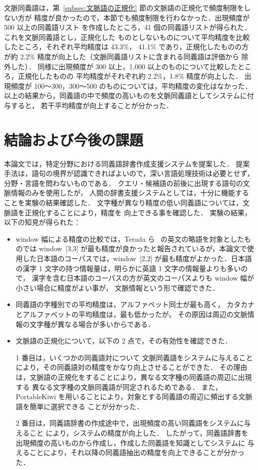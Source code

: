 \documentclass[japanese]{jnlp_1.4}
\begin{document}
文脈同義語は，第~\ref{subsec:文脈語の正規化} 節の文脈語の正規化で頻度制限をしない方が
精度が良かったので，本節でも頻度制限を行わなかった．出現頻度が 500 以上の同義語リスト
を作成したところ，41 個の同義語リストが得られた．これを文脈同義語とし，正規化した
ものとしないものについて平均精度を比較したところ，それぞれ平均精度は 43.3\%，
41.1\% であり，正規化したものの方が約 2.2\% 精度が向上した（文脈同義語リストに含まれる同義語は評価から
除外した）．
同様に出現頻度が 300 以上，1,000 以上のものについて比較したところ，正規化したものの
平均精度がそれぞれ約 2.2\%，1.8\% 精度が向上した．
出現頻度が 100〜300，300〜500 のものについては，平均精度の変化はなかった．
以上の結果から，同義語の中で頻度の高いものを文脈同義語としてシステムに付与すると，
若干平均精度が向上することが分かった．




\section{結論および今後の課題}

本論文では，特定分野における同義語辞書作成支援システムを提案した．
提案手法は，語句の境界が認識できればよいので，深い言語処理技術は必要とせず，
分野・言語を問わないものである．
クエリ・候補語の前後に出現する語句の文脈情報のみを使用したが，
人間の辞書支援システムとしては，十分に機能することを実験の結果確認した．
文字種が異なり精度の低い同義語については，文脈語を正規化することにより，精度を
向上できる事を確認した．
実験の結果，以下の知見が得られた：
\begin{itemize}

\item window 幅による精度の比較では，Terada ら~\cite{terada04} の英文の略語を対象としたものでは window~[3,3] が最も精度が良かったと報告されているが，本論文で使用した日本語のコーパスでは，window~[2,2] が最も精度がよかった．日本語の漢字 1 文字の持つ情報量は，明らかに英語 1 文字の情報量よりも多いので，
漢字を含む日本語のコーパスの方が英文のコーパスよりも window 幅が小さい場合に精度がよい事が，
文脈情報という形で確認できた．

\item 同義語の字種別での平均精度は，アルファベット同士が最も高く，
カタカナとアルファベットの平均精度は，最も低かったが，
その原因は周辺の文脈情報の文字種が異なる場合が多いからである．

\item 文脈語の正規化について，以下の 2 点で，その有効性を確認できた．

1 番目は，いくつかの同義語対について
文脈同義語をシステムに与えることにより，その同義語対の精度をかなり向上させることができた．
その理由は，文脈語の正規化をすることにより，異なる文字種の同義語の周辺に出現する
異なる文字種の文脈同義語が同定されるためである．
また，PortableKiwi を用いることにより，対象とする同義語の周辺に頻出する文脈語を簡単に選択できる
ことが分かった．

2 番目は，同義語辞書の作成途中で，出現頻度の高い同義語をシステムに与えること
により，システムの精度が向上した．
したがって，同義語辞書を出現頻度の高いものから作成し，作成した同義語を知識としてシステムに
与えることにより，それ以降の同義語抽出の精度を向上できることが分かった．

\end{itemize}
\end{document}
